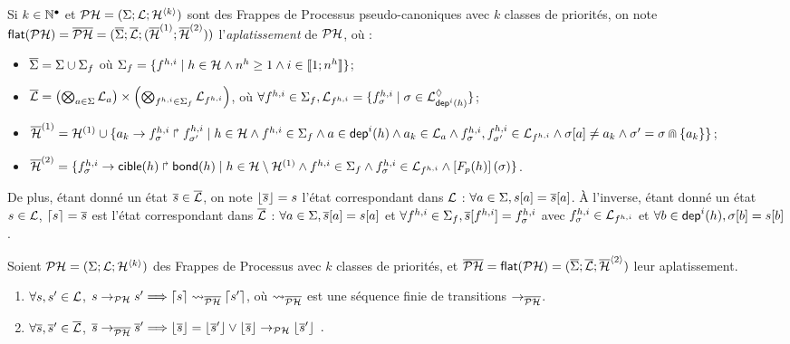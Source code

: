 \begin{definition}
  Si $k \in \mathbb{N}^\bullet$ et $\mathcal{PH} = (\Sigma; \mathcal{L}; \mathcal{H}^{{\langle k \rangle}})$
  sont des Frappes de Processus pseudo-canoniques avec $k$ classes de priorités,
  on note $\mathsf{flat}(\mathcal{PH}) = \overline{\mathcal{PH}} = (\overline{\Sigma}; \overline{\mathcal{L}}; (\overline{\mathcal{H}}^{(1)}; \overline{\mathcal{H}}^{(2)}))$
  l'\emph{aplatissement} de $\mathcal{PH}$, où :
  \begin{itemize}
    \item $\overline{\Sigma} = \Sigma \cup \Sigma_f$
      où $\Sigma_f = \{ f^{h,i} \mid h \in \mathcal{H} \wedge n^{h} \geq 1 \wedge i \in \llbracket 1; n^{h} \rrbracket \}$;
    \item $\overline{\mathcal{L}} = \left( \bigotimes_{a \in \Sigma} \mathcal{L}_{a} \right) \times
      \left(\bigotimes_{f^{h,i} \in \Sigma_f} \mathcal{L}_{f^{h,i}} \right)$, où
      $\forall f^{h,i} \in \Sigma_f, \mathcal{L}_{f^{h,i}} =
        \{ f^{h,i}_\sigma \mid \sigma \in \mathcal{L}^\lozenge_{\mathsf{dep}^{i}(h)} \}$;
    \item $\overline{\mathcal{H}}^{(1)} = \mathcal{H}^{(1)} \cup
      \{ a_k\rightarrow f^{h,i}_\sigma\Rsh f^{h,i}_{\sigma'} \mid
      h \in \mathcal{H} \wedge f^{h,i} \in \Sigma_f \wedge
      a \in \mathsf{dep}^{i}(h) \wedge a_k \in \mathcal{L}_a \wedge
      f^{h,i}_\sigma , f^{h,i}_{\sigma'} \in \mathcal{L}_{f^{h,i}} \wedge
      {\sigma[a]} \neq a_k \wedge \sigma' = \sigma \Cap \{ a_k \} \}$;
    \item $\overline{\mathcal{H}}^{(2)}=\{ f^{h,i}_\sigma\rightarrow\mathsf{cible}(h)\Rsh\mathsf{bond}(h) \mid
      h \in \mathcal{H} \setminus \mathcal{H}^{(1)} \wedge f^{h,i} \in \Sigma_f \wedge
      f^{h,i}_\sigma \in \mathcal{L}_{f^{h,i}} \wedge \left[F_{p}(h)\right](\sigma) \}$.
  \end{itemize}
  De plus, étant donné un état $\overline{s} \in \overline{\mathcal{L}}$,
  on note $\lfloor \overline{s} \rfloor = s$ l'état correspondant dans $\mathcal{L}$ :
  $\forall a \in \Sigma, {s[a]} = {\overline{s}[a]}$.
  À l'inverse, étant donné un état $s \in \mathcal{L}$,
  $\lceil s \rceil = \overline{s}$ est l'état correspondant dans $\overline{\mathcal{L}}$ :
  $\forall a \in \Sigma, {\overline{s}[a]} = {s[a]}$
  et $\forall f^{h,i} \in \Sigma_f, {\overline{s}[f^{h,i}]} = f^{h,i}_\sigma$
  avec $f^{h,i}_\sigma \in \mathcal{L}_{f^{h,i}}$
  et $\forall b \in \mathsf{dep}^{i}(h), {\sigma[b]} = {s[b]}$.
\end{definition}

\begin{theorem}[$\PH \approx \PHflat(\PH)$]
  Soient $\mathcal{PH} = (\Sigma; \mathcal{L}; \mathcal{H}^{{\langle k \rangle}})$ des Frappes de Processus avec $k$
  classes de priorités,
  et $\overline{\mathcal{PH}} = \mathsf{flat}(\mathcal{PH}) = (\overline{\Sigma}; \overline{\mathcal{L}}; \overline{\mathcal{H}}^{{\langle 2 \rangle}})$ leur aplatissement.
  \begin{enumerate}
    \item \label{php2ph} $\forall s, s' \in \mathcal{L}$,
      $s \rightarrow_{\mathcal{PH}} s' \Longrightarrow \lceil s \rceil \rightsquigarrow_{\overline{\mathcal{PH}}} \lceil s' \rceil$,
      où $\rightsquigarrow_{\overline{\mathcal{PH}}}$ est une séquence finie de transitions $\rightarrow_{\overline{\mathcal{PH}}}$.
    \item \label{ph2php} $\forall \overline{s}, \overline{s}' \in \overline{\mathcal{L}}$,
      $\overline{s} \rightarrow_{\overline{\mathcal{PH}}} \overline{s}' \Longrightarrow \lfloor \overline{s} \rfloor = \lfloor \overline{s}' \rfloor \vee
      \lfloor \overline{s} \rfloor \rightarrow_{\mathcal{PH}} \lfloor \overline{s}' \rfloor \enspace.$
  \end{enumerate}
\end{theorem}

